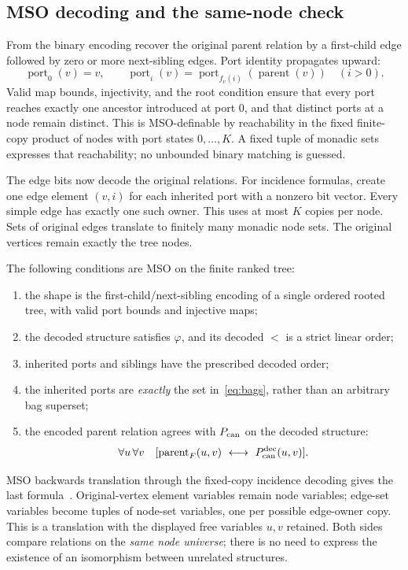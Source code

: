 \documentclass[11pt]{article}
\theoremstyle{definition}\newtheorem{definition}[theorem]{Definition}
\theoremstyle{remark}\newtheorem{remark}[theorem]{Remark}
\begin{document}
\subsection{MSO decoding and the same-node check}
From the binary encoding recover the original parent relation by a first-child edge followed by zero or more next-sibling edges. Port identity propagates upward:
\[
 \operatorname{port}_0(v)=v,\qquad
 \operatorname{port}_i(v)=
 \operatorname{port}_{f_v(i)}(\operatorname{parent}(v))\quad(i>0).
\]
Valid map bounds, injectivity, and the root condition ensure that every port reaches exactly one ancestor introduced at port $0$, and that distinct ports at a node remain distinct. This is MSO-definable by reachability in the fixed finite-copy product of nodes with port states $0,\ldots,K$. A fixed tuple of monadic sets expresses that reachability; no unbounded binary matching is guessed.

The edge bits now decode the original relations. For incidence formulas, create one edge element $(v,i)$ for each inherited port with a nonzero bit vector. Every simple edge has exactly one such owner. This uses at most $K$ copies per node. Sets of original edges translate to finitely many monadic node sets. The original vertices remain exactly the tree nodes.

The following conditions are MSO on the finite ranked tree:
\begin{enumerate}[label=(\roman*)]
\item the shape is the first-child/next-sibling encoding of a single ordered rooted tree, with valid port bounds and injective maps;
\item the decoded structure satisfies $\varphi$, and its decoded $<$ is a strict linear order;
\item inherited ports and siblings have the prescribed decoded order;
\item the inherited ports are \emph{exactly} the set in~\eqref{eq:bags}, rather than an arbitrary bag superset;
\item the encoded parent relation agrees with $P_{\rm can}$ on the decoded structure:
\[
 \forall u\,\forall v\quad
 [\operatorname{parent}_F(u,v)\ \longleftrightarrow\ P_{\rm can}^{\rm dec}(u,v)].
\]
\end{enumerate}
MSO backwards translation through the fixed-copy incidence decoding gives the last formula~\cite[Chapter 7, Theorem 7.10]{CourcelleEngelfriet2012}. Original-vertex element variables remain node variables; edge-set variables become tuples of node-set variables, one per possible edge-owner copy. This is a translation with the displayed free variables $u,v$ retained. Both sides compare relations on the \emph{same node universe}; there is no need to express the existence of an isomorphism between unrelated structures.
\end{document}
